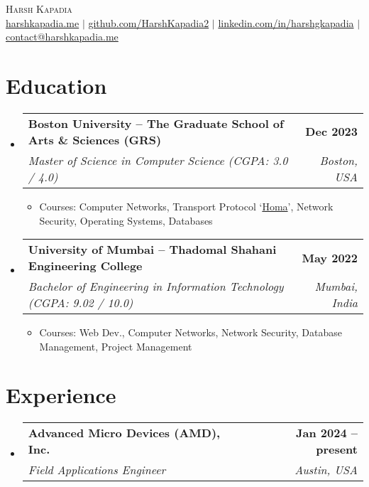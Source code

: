 \documentclass[letterpaper,11pt]{article}
\makeatletter
\newcommand{\resumeItem}[1]{
  \item\small{
    {#1 \vspace{-2pt}}
  }
}
\newcommand{\resumeSubheading}[4]{
  \vspace{-2pt}\item
    \begin{tabular*}{1.0\textwidth}[t]{l@{\extracolsep{\fill}}r}
      \vspace{-2pt}\textbf{#1} & \textbf{\small #2} \\
      \textit{\small#3} & \textit{\small #4} \\
    \end{tabular*}\vspace{-7pt}
}
\newcommand{\resumeSubHeadingListStart}{\begin{itemize}[leftmargin=0.0in, label={}]}
\newcommand{\resumeSubHeadingListEnd}{\end{itemize}}
\newcommand{\resumeItemListStart}{\begin{itemize}}
\newcommand{\resumeItemListEnd}{\end{itemize}\vspace{-5pt}}
\makeatother
\begin{document}

\begin{center}
    {\huge \scshape Harsh Kapadia} \\ \vspace{5pt}
    \small
    \href{https://harshkapadia.me}{harshkapadia.me} $|$ \href{https://github.com/HarshKapadia2}{github.com/HarshKapadia2} $|$ \href{https://linkedin.com/in/harshgkapadia}{linkedin.com/in/harshgkapadia} $|$ \href{mailto:contact@harshkapadia.me}{contact@harshkapadia.me}
    \vspace{-8pt}
\end{center}


\section{Education}
    \resumeSubHeadingListStart
        \resumeSubheading
            {Boston University -- The Graduate School of Arts \& Sciences (GRS)}{Dec 2023}
            {Master of Science in Computer Science (CGPA: 3.0 / 4.0)}{Boston, USA}
            \resumeItemListStart
                \resumeItem{Courses: Computer Networks, Transport Protocol `\href{https://networking.harshkapadia.me/files/homa/report}{Homa}', Network Security, Operating Systems, Databases}
            \resumeItemListEnd

        \resumeSubheading
            {University of Mumbai -- Thadomal Shahani Engineering College}{May 2022}
            {Bachelor of Engineering in Information Technology (CGPA: 9.02 / 10.0)}{Mumbai, India}
            \resumeItemListStart
                \resumeItem{Courses: Web Dev., Computer Networks, Network Security, Database Management, Project Management}
            \resumeItemListEnd
    \resumeSubHeadingListEnd
\vspace{-18pt}


\section{Experience}
    \resumeSubHeadingListStart
        \resumeSubheading
            {Advanced Micro Devices (AMD), Inc.}{Jan 2024 -- present}
            {Field Applications Engineer}{Austin, USA}
    \resumeSubHeadingListEnd
\vspace{-12pt}
\end{document}
